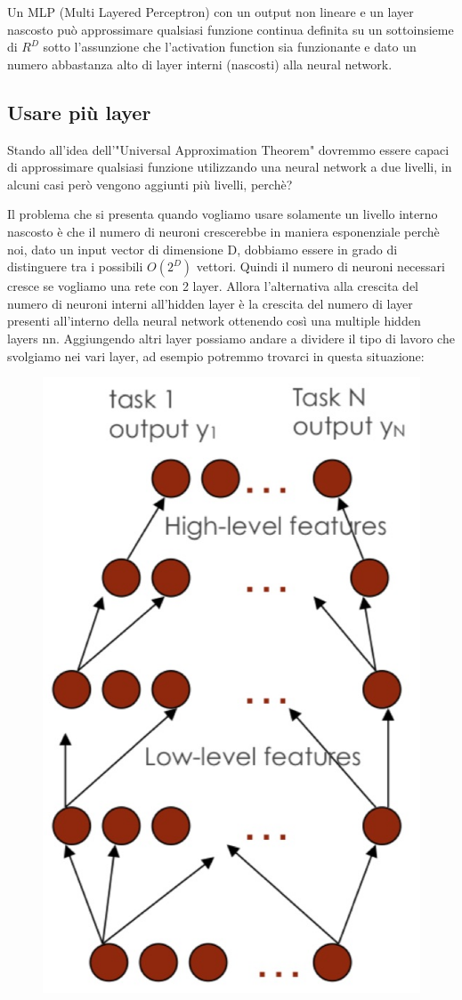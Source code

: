 \documentclass[14pt]{extreport}
\begin{document}
Un MLP (Multi Layered Perceptron) con un output non lineare e un layer nascosto può approssimare qualsiasi funzione continua definita su un
sottoinsieme di $R^D$ sotto l'assunzione che l'activation function sia funzionante e dato un numero abbastanza alto di layer interni (nascosti) alla
neural network. 

\subsection{Usare più layer}

Stando all'idea dell'"Universal Approximation Theorem" dovremmo essere capaci di approssimare qualsiasi funzione utilizzando una neural network a due
livelli, in alcuni casi però vengono aggiunti più livelli, perchè?

Il problema che si presenta quando vogliamo usare solamente un livello interno nascosto è che il numero di neuroni crescerebbe in maniera esponenziale
perchè noi, dato un input vector di dimensione D, dobbiamo essere in grado di distinguere tra i possibili $O(2^D)$ vettori. Quindi il numero di
neuroni necessari cresce se vogliamo una rete con 2 layer. Allora l'alternativa alla crescita del numero di neuroni interni all'hidden layer è la
crescita del numero di layer presenti all'interno della neural network ottenendo così una multiple hidden layers nn. Aggiungendo altri layer possiamo
andare a dividere il tipo di lavoro che svolgiamo nei vari layer, ad esempio potremmo trovarci in questa situazione:

\begin{figure}[H]
\centering
\includegraphics[width=0.5\linewidth]{372.jpeg}
\end{figure}
\end{document}
